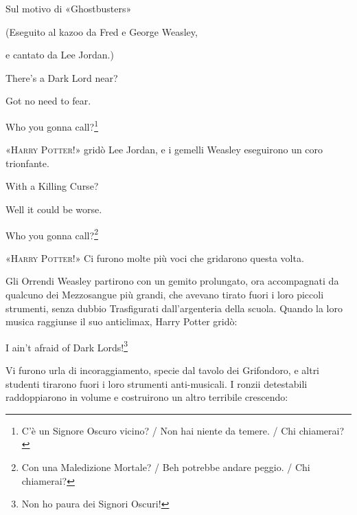 \begin{center}
\begin{itpars}
Sul motivo di «Ghostbusters»

(Eseguito al kazoo da Fred e George Weasley,

e cantato da Lee Jordan.)

\vspace{0.8em}

There’s a Dark Lord near?

Got no need to fear.

Who you gonna call?\footnote{C'è un Signore Oscuro vicino? / Non hai niente da temere. / Chi chiamerai?}
\end{itpars}

\vspace{0.8em}

«\textsc{Harry Potter}!» gridò Lee Jordan, e i gemelli Weasley eseguirono un coro trionfante.

\vspace{0.8em}

\begin{itpars}
With a Killing Curse?

Well it could be worse.

Who you gonna call?\footnote{Con una Maledizione Mortale? / Beh potrebbe andare peggio. / Chi chiamerai?}
\end{itpars}

\vspace{0.8em}

«\textsc{Harry Potter}!» Ci furono molte più voci che gridarono questa volta.

\end{center}

Gli Orrendi Weasley partirono con un gemito prolungato, ora accompagnati da qualcuno dei Mezzosangue più grandi, che avevano tirato fuori i loro piccoli strumenti, senza dubbio Trasfigurati dall’argenteria della scuola. Quando la loro musica raggiunse il suo anticlimax, Harry Potter gridò:

\begin{center}
\begin{itpars}
I ain’t afraid of Dark Lords!\footnote{Non ho paura dei Signori Oscuri!}
\end{itpars}
\end{center}

Vi furono urla di incoraggiamento, specie dal tavolo dei Grifondoro, e altri studenti tirarono fuori i loro strumenti anti-musicali. I ronzii detestabili raddoppiarono in volume e costruirono un altro terribile crescendo:

